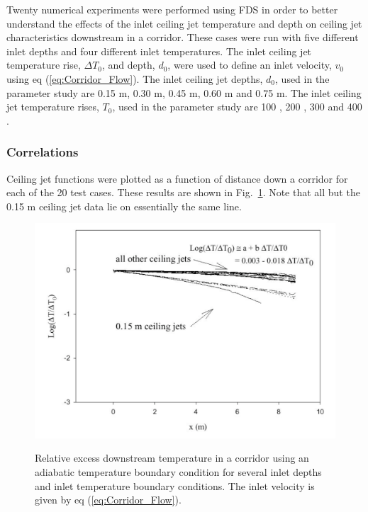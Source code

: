 Twenty numerical experiments were performed using FDS in order to better understand the effects of the inlet ceiling jet temperature and depth on ceiling jet characteristics downstream in a corridor.  These cases were run with five different inlet depths and four different inlet temperatures.  The inlet ceiling jet temperature rise, $\Delta T_0$, and depth, $d_0$, were used to define an inlet velocity, $v_0$ using eq (\ref{eq:Corridor_Flow}).  The inlet ceiling jet depths, $d_0$, used in the parameter study are 0.15 m, 0.30 m, 0.45 m, 0.60 m and 0.75 m. The inlet ceiling jet temperature rises, $T_0$, used in the parameter study are 100 \degc, 200 \degc, 300 \degc and 400 \degc.

\subsubsection{Correlations}

Ceiling jet functions were plotted as a function of distance down a corridor for each of the 20 test cases.  These results are shown in Fig.~\ref{fig:Corr_Flow}.  Note that all but the 0.15 m ceiling jet data lie on essentially the same line.

\begin{figure}
\begin{center}
\includegraphics[width=5.0in]{FIGURES/Theory/Corr_Flow}\\
\end{center}
\caption{Relative excess downstream temperature in a corridor using an adiabatic temperature boundary condition for several inlet depths and inlet temperature boundary conditions. The inlet velocity is given by eq (\ref{eq:Corridor_Flow}).}
 \label{fig:Corr_Flow}
\end{figure}

